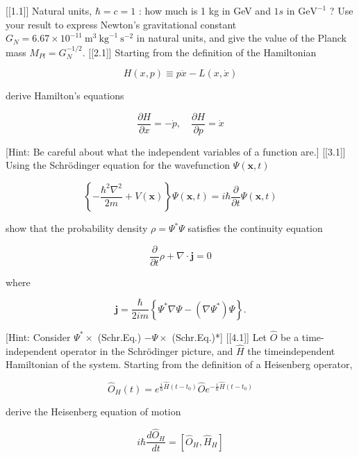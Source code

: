 [[1.1]] Natural units, $\hbar=c=1$ : how much is 1 kg in GeV and $1 s$ in $\mathrm{GeV}^{-1}$ ? Use your result to express Newton's gravitational constant $G_N=6.67 \times 10^{-11} \mathrm{~m}^3 \mathrm{~kg}^{-1} \mathrm{~s}^{-2}$ in natural units, and give the value of the Planck mass $M_{P l}=G_N^{-1 / 2}$.
[[2.1]] Starting from the definition of the Hamiltonian

$$
H(x, p) \equiv p \dot{x}-L(x, \dot{x})
$$

derive Hamilton's equations

$$
\frac{\partial H}{\partial x}=-\dot{p}, \quad \frac{\partial H}{\partial p}=\dot{x}
$$

[Hint: Be careful about what the independent variables of a function are.]
[[3.1]] Using the Schrödinger equation for the wavefunction $\Psi(\mathbf{x}, t)$

$$
\left\{-\frac{\hbar^2 \nabla^2}{2 m}+V(\mathbf{x})\right\} \Psi(\mathbf{x}, t)=i \hbar \frac{\partial}{\partial t} \Psi(\mathbf{x}, t)
$$

show that the probability density $\rho=\Psi^* \Psi$ satisfies the continuity equation

$$
\frac{\partial}{\partial t} \rho+\nabla \cdot \mathbf{j}=0
$$

where

$$
\mathbf{j}=\frac{\hbar}{2 i m}\left\{\Psi^* \nabla \Psi-\left(\nabla \Psi^*\right) \Psi\right\} .
$$

[Hint: Consider $\Psi^* \times$ (Schr.Eq.) $-\Psi \times$ (Schr.Eq.)*]
[[4.1]] Let $\hat{O}$ be a time-independent operator in the Schrödinger picture, and $\hat{H}$ the timeindependent Hamiltonian of the system. Starting from the definition of a Heisenberg operator,

$$
\hat{O}_H(t)=e^{\frac{i}{\hbar} \hat{H}\left(t-t_0\right)} \hat{O} e^{-\frac{i}{\hbar} \hat{H}\left(t-t_0\right)}
$$

derive the Heisenberg equation of motion

$$
i \hbar \frac{d \hat{O}_H}{d t}=\left[\hat{O}_H, \hat{H}_H\right]
$$